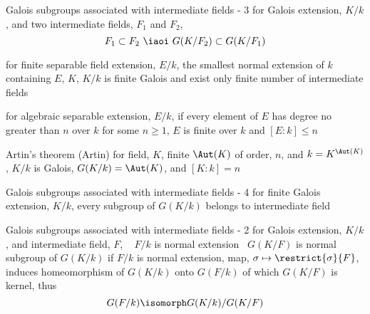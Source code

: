 \documentclass[17pt,landscape]{foils}
\begin{document}
{\begin{mycorollary}{Galois subgroups associated with intermediate fields - 3}
	for Galois extension, $K/k$,
	and
	two intermediate fields, $F_1$ and $F_2$,
%
	$$
		F_1\subset F_2
		\mbox{ \iaoi\ }
		G(K/F_2)\subset G(K/F_1)
	$$
\end{mycorollary}

%
\begin{mycorollary}{}
	for finite separable field extension, $E/k$,
	the smallest normal extension of $k$ containing $E$, $K$,
	$K/k$ is finite Galois
	and exist only finite number of intermediate fields
\end{mycorollary}

\begin{mylemma}{}
	for algebraic separable extension, $E/k$,
	if every element of $E$ has degree no greater than $n$ over $k$
	for some $n\geq1$,
	$E$ is finite over $k$ and $[E:k]\leq n$
\end{mylemma}

\begin{mytheorem}{Artin's theorem}
	\label{theorem:Artins theorem}
	(Artin)
	for field, $K$,
	finite $\Aut(K)$ of order, $n$,
	and $k = K^{\Aut(K)}$,
	$K/k$ is Galois,
	$G(K/k)= \Aut(K)$,
	and $[K:k] = n$
\end{mytheorem}

\begin{mycorollary}{Galois subgroups associated with intermediate fields - 4}
	for finite Galois extension, $K/k$,
	every subgroup of $G(K/k)$ belongs to intermediate field
\end{mycorollary}

\begin{mytheorem}{Galois subgroups associated with intermediate fields - 2}
	for Galois extension, $K/k$,
	and intermediate field, $F$,
	\shrinkspacewithintheoremslike\
	\ibit
	\iitem
		$F/k$ is normal extension
		\iaoi\
		$G(K/F)$ is normal subgroup of $G(K/k)$
	\iitem
		if $F/k$ is normal extension,
		map, $\sigma \mapsto \restrict{\sigma}{F}$,
		induces
		homeomorphism
		of $G(K/k)$ onto $G(F/k)$
		of which $G(K/F)$ is kernel,
		thus
		$$
			G(F/k) \isomorph G(K/k)/G(K/F)
		$$
	\eit
\end{mytheorem}


}
\end{document}
